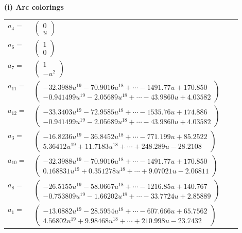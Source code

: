 \documentclass[1p]{elsarticle_modified}
\theoremstyle{definition}
\begin{document}
\flushleft \textbf{(i) Arc colorings}\\
\begin{tabular}{m{7pt} m{180pt} m{7pt} m{180pt} }
\flushright $a_{4}=$&$\begin{pmatrix}0\\u\end{pmatrix}$ \\
\flushright $a_{6}=$&$\begin{pmatrix}1\\0\end{pmatrix}$ \\
\flushright $a_{7}=$&$\begin{pmatrix}1\\- u^2\end{pmatrix}$ \\
\flushright $a_{11}=$&$\begin{pmatrix}-32.3988 u^{19}-70.9016 u^{18}+\cdots-1491.77 u+170.850\\-0.941499 u^{19}-2.05689 u^{18}+\cdots-43.9860 u+4.03582\end{pmatrix}$ \\
\flushright $a_{12}=$&$\begin{pmatrix}-33.3403 u^{19}-72.9585 u^{18}+\cdots-1535.76 u+174.886\\-0.941499 u^{19}-2.05689 u^{18}+\cdots-43.9860 u+4.03582\end{pmatrix}$ \\
\flushright $a_{3}=$&$\begin{pmatrix}-16.8236 u^{19}-36.8452 u^{18}+\cdots-771.199 u+85.2522\\5.36412 u^{19}+11.7183 u^{18}+\cdots+248.289 u-28.2108\end{pmatrix}$ \\
\flushright $a_{10}=$&$\begin{pmatrix}-32.3988 u^{19}-70.9016 u^{18}+\cdots-1491.77 u+170.850\\0.168831 u^{19}+0.351278 u^{18}+\cdots+9.07021 u-2.06811\end{pmatrix}$ \\
\flushright $a_{8}=$&$\begin{pmatrix}-26.5155 u^{19}-58.0667 u^{18}+\cdots-1216.85 u+140.767\\-0.753809 u^{19}-1.66202 u^{18}+\cdots-33.7724 u+2.85889\end{pmatrix}$ \\
\flushright $a_{1}=$&$\begin{pmatrix}-13.0882 u^{19}-28.5954 u^{18}+\cdots-607.666 u+65.7562\\4.56802 u^{19}+9.98468 u^{18}+\cdots+210.998 u-23.7432\end{pmatrix}$ \\

\end{tabular}
\end{document}
